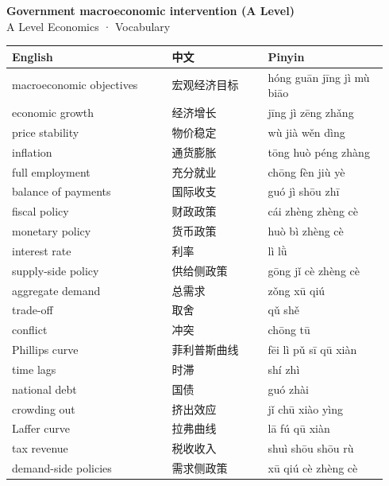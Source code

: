 \documentclass[11pt]{article}
\begin{document}
\begin{center}
  {\LARGE\bfseries Government macroeconomic intervention (A Level)}\\[0.35em]
  {\large A Level Economics · Vocabulary}
\end{center}
\vspace{0.6em}

\begin{longtable}{@{}p{0.40\linewidth}p{0.24\linewidth}p{0.30\linewidth}@{}}
\toprule
\textbf{English} & \textbf{中文} & \textbf{Pinyin} \\
\midrule
\endhead
\bottomrule
\endlastfoot
macroeconomic objectives & 宏观经济目标 & hóng guān jīng jì mù biāo \\
economic growth & 经济增长 & jīng jì zēng zhǎng \\
price stability & 物价稳定 & wù jià wěn dìng \\
inflation & 通货膨胀 & tōng huò péng zhàng \\
full employment & 充分就业 & chōng fèn jiù yè \\
balance of payments & 国际收支 & guó jì shōu zhī \\
fiscal policy & 财政政策 & cái zhèng zhèng cè \\
monetary policy & 货币政策 & huò bì zhèng cè \\
interest rate & 利率 & lì lǜ \\
supply-side policy & 供给侧政策 & gōng jǐ cè zhèng cè \\
aggregate demand & 总需求 & zǒng xū qiú \\
trade-off & 取舍 & qǔ shě \\
conflict & 冲突 & chōng tū \\
Phillips curve & 菲利普斯曲线 & fēi lì pǔ sī qū xiàn \\
time lags & 时滞 & shí zhì \\
national debt & 国债 & guó zhài \\
crowding out & 挤出效应 & jǐ chū xiào yìng \\
Laffer curve & 拉弗曲线 & lā fú qū xiàn \\
tax revenue & 税收收入 & shuì shōu shōu rù \\
demand-side policies & 需求侧政策 & xū qiú cè zhèng cè \\
\end{longtable}
\end{document}

